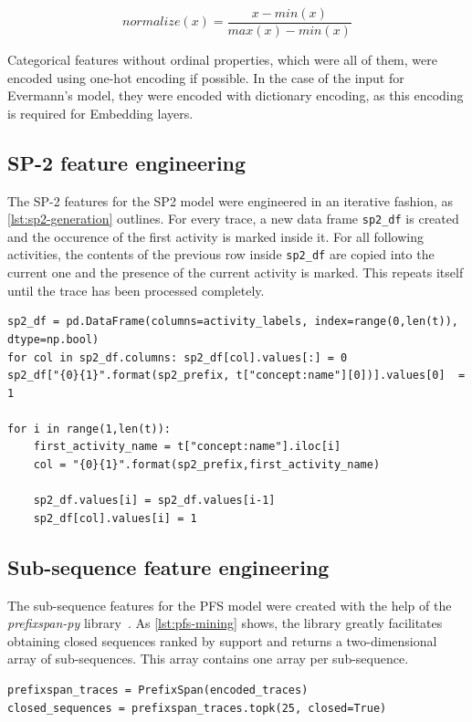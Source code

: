 $$normalize(x) = \frac{x-min(x)}{max(x)-min(x)}$$

Categorical features without ordinal properties, which were all of them, were encoded using one-hot encoding if possible. In the case of the input for Evermann's model, they were encoded with dictionary encoding, as this encoding is required for Embedding layers.

\subsection*{SP-2 feature engineering}
The SP-2 features for the SP2 model were engineered in an iterative fashion, as \autoref{lst:sp2-generation} outlines. For every trace, a new data frame \texttt{sp2\_df} is created and the occurence of the first activity is marked inside it. For all following activities, the contents of the previous row inside \texttt{sp2\_df} are copied into the current one and the presence of the current activity is marked. This repeats itself until the trace has been processed completely.

\begin{lstlisting}[caption={SP-2 feature generation algorithm for a single trace},label={lst:sp2-generation}]
sp2_df = pd.DataFrame(columns=activity_labels, index=range(0,len(t)), dtype=np.bool)
for col in sp2_df.columns: sp2_df[col].values[:] = 0
sp2_df["{0}{1}".format(sp2_prefix, t["concept:name"][0])].values[0]  = 1

for i in range(1,len(t)):
    first_activity_name = t["concept:name"].iloc[i]
    col = "{0}{1}".format(sp2_prefix,first_activity_name)
    
    sp2_df.values[i] = sp2_df.values[i-1]
    sp2_df[col].values[i] = 1
\end{lstlisting}

\subsection*{Sub-sequence feature engineering}
The sub-sequence features for the PFS model were created with the help of the \textit{prefixspan-py} library~\cite{web:prefixspan-py}. As \autoref{lst:pfs-mining} shows, the library greatly facilitates obtaining closed sequences ranked by support and returns a two-dimensional array of sub-sequences. This array contains one array per sub-sequence.

\begin{lstlisting}[caption={Obtaining closed sequences using the \textit{prefixspan-py} library.}, label={lst:pfs-mining}]
prefixspan_traces = PrefixSpan(encoded_traces)
closed_sequences = prefixspan_traces.topk(25, closed=True)
\end{lstlisting}

